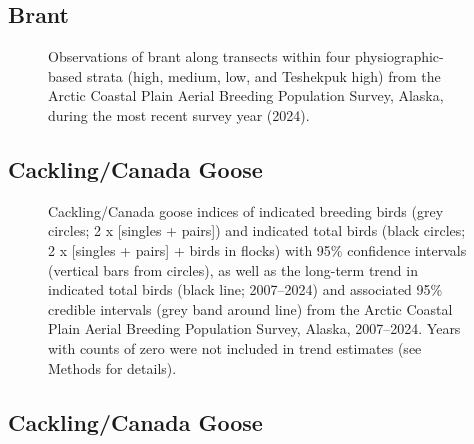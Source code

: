 \documentclass[
]{article}
\begin{document}
\endgroup{}

\newpage{}

\subsection*{Brant}\label{brant-2}

\begin{figure}


\caption{\label{fig-BRANmap}Observations of brant along transects within
four physiographic-based strata (high, medium, low, and Teshekpuk high)
from the Arctic Coastal Plain Aerial Breeding Population Survey, Alaska,
during the most recent survey year (2024).}

\end{figure}%

\newpage{}

\subsection*{Cackling/Canada Goose}\label{cacklingcanada-goose}

\begin{figure}


\caption{\label{fig-CCGO}Cackling/Canada goose indices of indicated
breeding birds (grey circles; 2 x {[}singles + pairs{]}) and indicated
total birds (black circles; 2 x {[}singles + pairs{]} + birds in flocks)
with 95\% confidence intervals (vertical bars from circles), as well as
the long-term trend in indicated total birds (black line; 2007--2024)
and associated 95\% credible intervals (grey band around line) from the
Arctic Coastal Plain Aerial Breeding Population Survey, Alaska,
2007--2024. Years with counts of zero were not included in trend
estimates (see Methods for details).}

\end{figure}%

\newpage{}

\subsection*{Cackling/Canada Goose}\label{cacklingcanada-goose-1}
\end{document}
